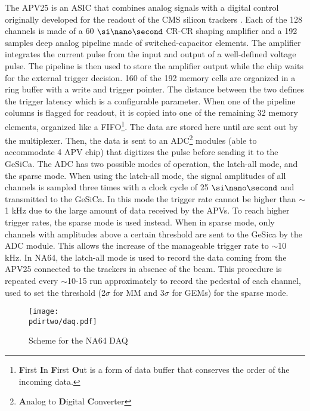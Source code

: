 The APV25 is an ASIC that combines analog signals with a digital control \cite{Bodlak_2013} originally developed for the readout of the CMS silicon trackers \cite{article,inproceedings,apv-useguide}. Each of the 128 channels is made of a 60 $\nas$ CR-CR shaping amplifier and a 192 samples deep analog pipeline made of switched-capacitor elements. The amplifier integrates the current pulse from the input and output of a well-defined voltage pulse. The pipeline is then used to store the amplifier output while the chip waits for the external trigger decision. 160 of the 192 memory cells are organized in a ring buffer with a write and trigger pointer. The distance between the two defines the trigger latency which is a configurable parameter. When one of the pipeline columns is flagged for readout, it is copied into one of the remaining 32 memory elements, organized like a FIFO\footnote{\textbf{F}irst \textbf{I}n \textbf{F}irst \textbf{O}ut is a form of data buffer that conserves the order of the incoming data.}. The data are stored here until are sent out by the multiplexer. Then, the data is sent to an ADC\footnote{\textbf{A}nalog to \textbf{D}igital \textbf{C}onverter} modules (able to accommodate 4 APV chip) that digitizes the pulse before sending it to the GeSiCa. The ADC has two possible modes of operation, the latch-all mode, and the sparse mode. When using the latch-all mode, the signal amplitudes of all channels is sampled three times with a clock cycle of 25 $\nas$ and transmitted to the GeSiCa. In this mode the trigger rate cannot be higher than $\sim$1 \si{\kilo\hertz} due to the large amount of data received by the APVs. To reach higher trigger rates, the sparse mode is used instead. When in sparse mode, only channels with amplitudes above a certain threshold are sent to the GeSica by the ADC module. This allows the increase of the manageable trigger rate to $\sim$10 \si{\kilo\hertz}. In NA64, the latch-all mode is used to record the data coming from the APV25 connected to the trackers in absence of the beam. This procedure is repeated every $\sim$10-15 run approximately to record the pedestal of each channel, used to set the threshold (2$\sigma$ for MM and 3$\sigma$ for GEMs) for the sparse mode.

\begin{figure}[tbh!]
\centering
\texttt{[image: \\pdirtwo/daq.pdf]}
\caption{Scheme for the NA64 DAQ}
\label{fig:daq}
\end{figure}

